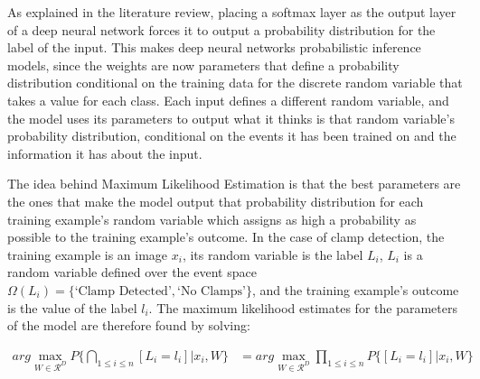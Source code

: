 \documentclass[a4paper,11pt]{article}
\begin{document}
As explained in the literature review, placing a softmax layer as the output layer of a deep neural network forces it to output a probability distribution for the label of the input. This makes deep neural networks probabilistic inference models, since the weights are now parameters that define a probability distribution conditional on the training data for the discrete random variable that takes a value for each class. Each input defines a different random variable, and the model uses its parameters to output what it thinks is that random variable's probability distribution, conditional on the events it has been trained on and the information it has about the input. 

The idea behind Maximum Likelihood Estimation is that the best parameters are the ones that make the model output that probability distribution for each training example's random variable which assigns as high a probability as possible to the training example's outcome. In the case of clamp detection, the training example is an image $x_i$, its random variable is the label $L_i$, $L_i$ is a random variable defined over the event space $\Omega(L_i) = \{\text{`Clamp Detected'},\text{`No Clamps'}\}$, and the training example's outcome is the value of the label $l_i$. The maximum likelihood estimates for the parameters of the model are therefore found by solving:



\begin{align}
arg\max\limits_{W \in \mathcal{R}^D} P\{\bigcap \limits_{1 \leq i \leq n} [L_i = l_i]|x_i,W\}
&= arg\max\limits_{W \in \mathcal{R}^D} \prod\limits_{1 \leq i \leq n} P\{[L_i = l_i]|x_i,W\} 
\end{align}
\end{document}
